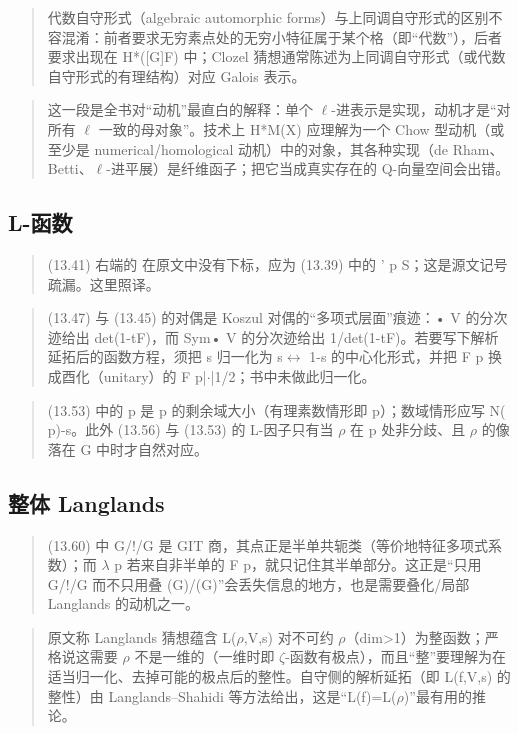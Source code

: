 \begin{quote}\small
代数自守形式（algebraic automorphic forms）与上同调自守形式的区别不容混淆：前者要求无穷素点处的无穷小特征属于某个格（即“代数”），后者要求出现在 H*([G]F) 中；Clozel 猜想通常陈述为上同调自守形式（或代数自守形式的有理结构）对应 Galois 表示。
\end{quote}

\begin{quote}\small
这一段是全书对“动机”最直白的解释：单个 $\ell$-进表示是实现，动机才是“对所有 $\ell$ 一致的母对象”。技术上 H*M(X) 应理解为一个 Chow 型动机（或至少是 numerical/homological 动机）中的对象，其各种实现（de Rham、Betti、$\ell$-进平展）是纤维函子；把它当成真实存在的 Q-向量空间会出错。
\end{quote}

\subsection*{L-函数}
\begin{quote}\small
(13.41) 右端的 在原文中没有下标，应为 (13.39) 中的 ' p S；这是源文记号疏漏。这里照译。
\end{quote}

\begin{quote}\small
(13.47) 与 (13.45) 的对偶是 Koszul 对偶的“多项式层面”痕迹：• V 的分次迹给出 det(1-tF)，而 Sym• V 的分次迹给出 1/det(1-tF)。若要写下解析延拓后的函数方程，须把 s 归一化为 s$\leftrightarrow$ 1-s 的中心化形式，并把 F p 换成酉化（unitary）的 F p|$\cdot$|1/2；书中未做此归一化。
\end{quote}

\begin{quote}\small
(13.53) 中的 p 是 p 的剩余域大小（有理素数情形即 p）；数域情形应写 N( p)-s。此外 (13.56) 与 (13.53) 的 L-因子只有当 $\rho$ 在 p 处非分歧、且 $\rho$ 的像落在 G 中时才自然对应。
\end{quote}

\subsection*{整体 Langlands}
\begin{quote}\small
(13.60) 中 G/!/G 是 GIT 商，其点正是半单共轭类（等价地特征多项式系数）；而 $\lambda$ p 若来自非半单的 F p，就只记住其半单部分。这正是“只用 G/!/G 而不只用叠 (G)/(G)”会丢失信息的地方，也是需要叠化/局部 Langlands 的动机之一。
\end{quote}

\begin{quote}\small
原文称 Langlands 猜想蕴含 L($\rho$,V,s) 对不可约 $\rho$（dim>1）为整函数；严格说这需要 $\rho$ 不是一维的（一维时即 $\zeta$-函数有极点），而且“整”要理解为在适当归一化、去掉可能的极点后的整性。自守侧的解析延拓（即 L(f,V,s) 的整性）由 Langlands–Shahidi 等方法给出，这是“L(f)=L($\rho$)”最有用的推论。
\end{quote}

